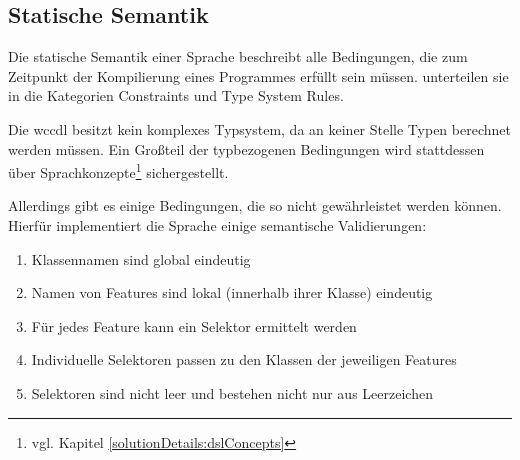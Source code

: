 \subsection{Statische Semantik}
    Die statische Semantik einer Sprache beschreibt alle Bedingungen,
    die zum Zeitpunkt der Kompilierung eines Programmes erfüllt sein müssen.
    \citet[Kapitel 4.3]{voelter:DslEngineering} unterteilen sie in die Kategorien
    Constraints und Type System Rules.

    Die \gls{wccdl} besitzt kein komplexes Typsystem,
    da an keiner Stelle Typen berechnet werden müssen.
    Ein Großteil der typbezogenen Bedingungen wird stattdessen über
    Sprachkonzepte\footnote{vgl. Kapitel \ref{solutionDetails:dslConcepts}}
    sichergestellt.

    Allerdings gibt es einige Bedingungen, die so nicht gewährleistet werden können.
    Hierfür implementiert die Sprache einige semantische Validierungen:

    \begin{enumerate}
        \item Klassennamen sind global eindeutig
        \item Namen von Features sind lokal (innerhalb ihrer Klasse) eindeutig
        \item Für jedes Feature kann ein Selektor ermittelt werden
        \item Individuelle Selektoren passen zu den Klassen der jeweiligen Features
        \item Selektoren sind nicht leer und bestehen nicht nur aus Leerzeichen
    \end{enumerate}

